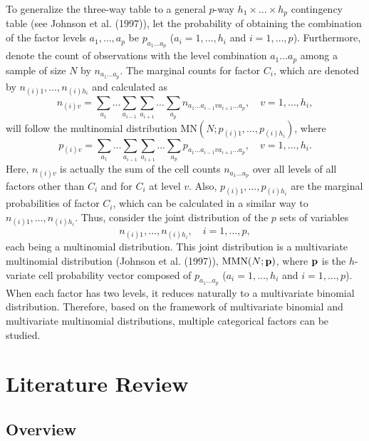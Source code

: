 To generalize the three-way table to a general $p$-way $h_1\times \ldots\times h_p$
contingency table (see Johnson et al. (1997)), let the probability of obtaining the
combination of the factor levels $a_1,\ldots,a_p$ be $p_{a_1\ldots a_p}$
($a_i=1,\ldots,h_i$ and $i=1,\ldots,p$). Furthermore, denote the count of
observations with the level combination $a_1\ldots a_p$ among a sample of size $N$
by $n_{a_1\ldots a_p}$. The marginal counts for factor $C_i$, which are denoted by
$n_{(i)1},\ldots,n_{(i)h_i}$ and calculated as
\[
n_{(i)v}=\sum_{a_1}\ldots\sum_{a_{i-1}}\sum_{a_{i+1}}\ldots \sum_{a_p}n_{a_1\ldots
a_{i-1}va_{i+1}\ldots a_p},\quad v=1,\ldots,h_i,
\]
will follow the multinomial distribution $\mbox{MN}(N; p_{(i)1},\ldots,p_{(i)h_i})$,
where
\[
p_{(i)v}=\sum_{a_1}\ldots\sum_{a_{i-1}}\sum_{a_{i+1}}\ldots \sum_{a_p}p_{a_1\ldots
a_{i-1}va_{i+1}\ldots a_p},\quad v=1,\ldots,h_i.
\]
Here, $n_{(i)v}$ is actually the sum of the cell counts $n_{a_1\ldots a_p}$ over all
levels of all factors other than $C_i$ and for $C_i$ at level $v$. Also,
$p_{(i)1},\ldots,p_{(i)h_i}$ are the marginal probabilities of factor $C_i$, which
can be calculated in a similar way to $n_{(i)1},\ldots,n_{(i)h_i}$. Thus, consider
the joint distribution of the $p$ sets of variables
\[
n_{(i)1},\ldots,n_{(i)h_i},\quad i=1,\ldots,p,
\]
each being a multinomial distribution. This joint distribution is a multivariate
multinomial distribution (Johnson et al. (1997)), $\mbox{MMN}(N;{\bf p})$, where
$\bf p$ is the $h$-variate cell probability vector composed of $p_{a_1\ldots a_p}$
($a_i=1,\ldots,h_i$ and $i=1,\ldots,p$). When each factor has two levels, it reduces
naturally to a multivariate binomial distribution. Therefore, based on the framework
of multivariate binomial and multivariate multinomial distributions, multiple
categorical factors can be studied.



\section{Literature Review}\label{sec1.2}

\subsection{Overview}

